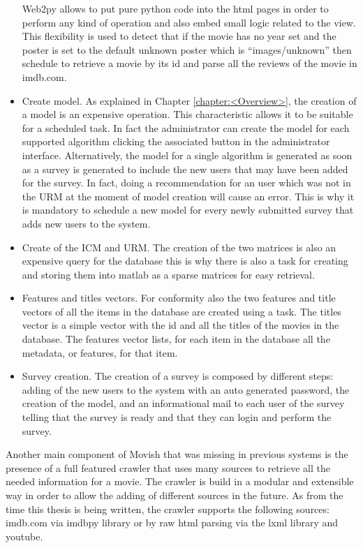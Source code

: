 \begin{itemize}
Web2py allows to put pure python code into the html pages in order to perform any kind of operation and also embed small logic related to the view. This flexibility is used to detect that if the movie has no year set and the poster is set to the default unknown poster which is ``images/unknown'' then schedule to retrieve a movie by its id and parse all the reviews of the movie in imdb.com.
\item Create model. As explained in Chapter \ref{chapter:<Overview>}, the creation of a model is an expensive operation. This characteristic allows it to be suitable for a scheduled task. In fact the administrator can create the model for each supported algorithm clicking the associated button in the administrator interface. Alternatively, the model for a single algorithm is generated as soon as a survey is generated to include the new users that may have been added for the survey.
In fact, doing a recommendation for an user which was not in the \ac{URM} at the moment of model creation will cause an error. This is why it is mandatory to schedule a new model for every newly submitted survey that adds new users to the system.
\item Create of the \ac{ICM} and \ac{URM}. The creation of the two matrices is also an expensive query for the database this is why there is also a task for creating and storing them into matlab as a sparse matrices for easy retrieval.
\item Features and titles vectors. For conformity also the two features and title vectors of all the items in the database are created using a task. The titles vector is a simple vector with the id and all the titles of the movies in the database. The features vector lists, for each item in the database all the metadata, or features, for that item.
\item Survey creation. The creation of a survey is composed by different steps: adding of the new users to the system with an auto generated password, the creation of the model, and an informational mail to each user of the survey telling that the survey is ready and that they can login and perform the survey.
\end{itemize}

Another main component of Movish that was missing in previous systems is the presence of a full featured crawler that uses many sources to retrieve all the needed information for a movie. The crawler is build in a modular and extensible way in order to allow the adding of different sources in the future. As from the time this thesis is being written, the crawler supports the following sources: imdb.com \cite{imdb} via imdbpy \cite{imdbpy} library or by raw html parsing via the lxml library and youtube. 


